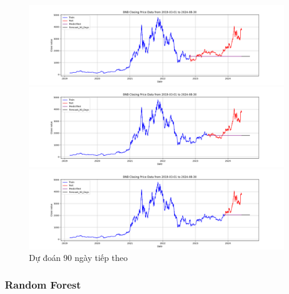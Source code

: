 \documentclass[conference]{IEEEtran}
\begin{document}
	\begin{figure}[H]
		\centering
		\begin{minipage}{0.15\textwidth}
			\centering
			\includegraphics[width=1\textwidth]{Figure/ARIMA_ETH_90days_73.png}
		\end{minipage}
		\hfill
		\begin{minipage}{0.15\textwidth}
			\centering
			\includegraphics[width=1\textwidth]{Figure/ARIMA_ETH_90days_82.png}
		\end{minipage}
		\hfill
		\begin{minipage}{0.15\textwidth}
			\centering
			\includegraphics[width=1\textwidth]{Figure/ARIMA_ETH_90days_91.png}
		\end{minipage}
		\caption{Dự đoán 90 ngày tiếp theo}
		\label{fig:1}
	\end{figure}
	
	\subsubsection{Random Forest} 
\end{document}
